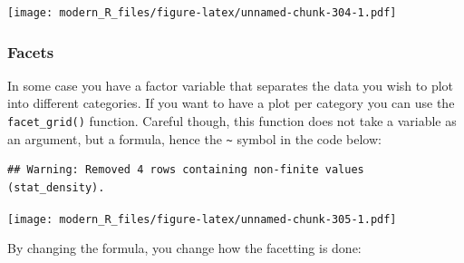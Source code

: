 \documentclass[]{gitbook}
\newenvironment{Shaded}{\begin{snugshade}}{\end{snugshade}}
\newcommand{\CommentTok}[1]{\textcolor[rgb]{0.56,0.35,0.01}{\textit{#1}}}
\newcommand{\DataTypeTok}[1]{\textcolor[rgb]{0.13,0.29,0.53}{#1}}
\newcommand{\KeywordTok}[1]{\textcolor[rgb]{0.13,0.29,0.53}{\textbf{#1}}}
\newcommand{\NormalTok}[1]{#1}
\newcommand{\OperatorTok}[1]{\textcolor[rgb]{0.81,0.36,0.00}{\textbf{#1}}}
\newcommand{\StringTok}[1]{\textcolor[rgb]{0.31,0.60,0.02}{#1}}
\theoremstyle{definition}
\theoremstyle{definition}
\theoremstyle{definition}
\theoremstyle{remark}
\begin{document}
\texttt{[image: modern\_R\_files/figure-latex/unnamed-chunk-304-1.pdf]}

\hypertarget{facets}{%
\subsubsection{Facets}\label{facets}}

In some case you have a factor variable that separates the data you wish
to plot into different categories. If you want to have a plot per
category you can use the \texttt{facet\_grid()} function. Careful
though, this function does not take a variable as an argument, but a
formula, hence the \texttt{\textasciitilde{}} symbol in the code below:

\begin{Shaded}
\end{Shaded}

\begin{verbatim}
## Warning: Removed 4 rows containing non-finite values (stat_density).
\end{verbatim}

\texttt{[image: modern\_R\_files/figure-latex/unnamed-chunk-305-1.pdf]}

By changing the formula, you change how the facetting is done:
\end{document}
